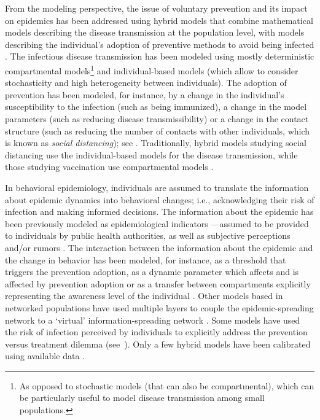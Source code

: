 From the modeling perspective, the issue of voluntary prevention and its impact on epidemics has been addressed using hybrid models that combine mathematical models describing the disease transmission at the population level, with models describing the individual's adoption of preventive methods to avoid being infected \cite[]{Verelst2016}. The infectious disease transmission has been modeled using mostly deterministic compartmental models\footnote{As opposed to stochastic models (that can also be compartmental), which can be particularly useful to model disease transmission among small populations.}  and individual-based models (which allow to consider stochasticity and high heterogeneity between individuals). The adoption of prevention has been modeled, for instance, by a change in the individual's susceptibility to the infection (such as being immunized), a change in the model parameters (such as reducing disease transmissibility) or a change in the contact structure (such as reducing the number of contacts with other individuals, which is known as \textit{social distancing}); see \cite{Verelst2016}. Traditionally, hybrid models studying social distancing use the individual-based models for the disease transmission, while those studying vaccination use compartmental models \cite[]{Verelst2016}.

In behavioral epidemiology, individuals are assumed to translate the information about epidemic dynamics into behavioral changes; i.e., acknowledging their risk of infection and making informed decisions. The information about the epidemic has been previously modeled as epidemiological indicators ---assumed to be provided to individuals by public health authorities, as well as subjective perceptions and/or rumors \cite[]{Verelst2016}. The interaction between the information about the epidemic and the change in behavior has been modeled, for instance, as a threshold that triggers the prevention adoption, as a dynamic parameter which affects and is affected by prevention adoption or as a transfer between compartments explicitly representing the awareness level of the individual \cite[]{Verelst2016}. Other models based in networked populations have used multiple layers to couple the epidemic-spreading network to a `virtual' information-spreading network \cite[]{Wang2016}. Some models have used the risk of infection perceived by individuals to explicitly address the prevention versus treatment dilemma (see~). Only a few hybrid models have been calibrated using available data \cite[]{Verelst2016}.

